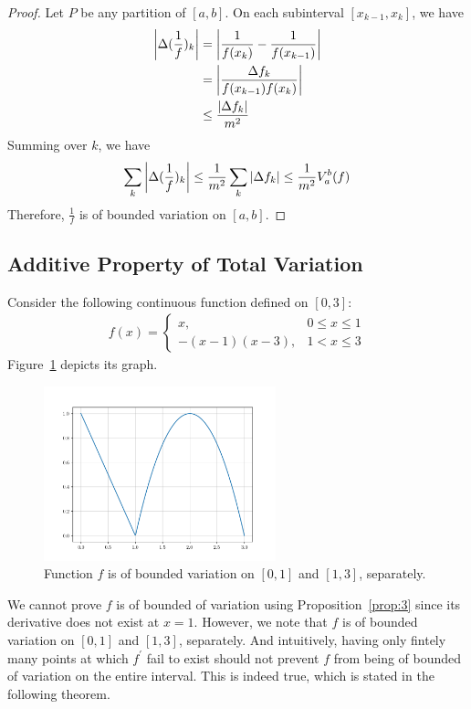 \documentclass[thmcnt=section, color=blue, 12pt]{my-elegantbook}
\begin{document}
\begin{proof}
	Let $P$ be any partition of $[a, b]$.
	On each subinterval $[x_{k-1}, x_k]$, we have
	\begin{align*}
		\left\lvert \Delta (\frac{1}{f})_k \right\rvert
		 & = \left\lvert \frac{1}{f(x_k)} - \frac{1}{f(x_{k-1})} \right\rvert \\
		 & = \left\lvert \frac{\Delta f_k}{f(x_{k-1}) f(x_k)} \right\rvert    \\
		 & \leq \frac{\left\lvert  \Delta f_k  \right\rvert}{m^2}
	\end{align*}
	Summing over $k$, we have
	\begin{align*}
		\sum_k \left\lvert \Delta (\frac{1}{f})_k \right\rvert
		\leq \frac{1}{m^2} \sum_k \left\lvert \Delta f_k \right\rvert
		\leq \frac{1}{m^2} V_a^b (f)
	\end{align*}
	Therefore, $\frac{1}{f}$ is of bounded variation on $[a, b]$.
\end{proof}

\subsection{Additive Property of Total Variation}

Consider the following continuous function defined on $[0, 3]$:
\begin{align*}
	f(x) = \begin{cases}
		       x,           & 0 \leq x \leq 1 \\
		       -(x-1)(x-3), & 1 < x \leq 3
	       \end{cases}
\end{align*}
Figure~\ref{fig:4} depicts its graph.
\begin{figure}[H]
	\centering
	\includegraphics[width=0.6\textwidth]{figures/additive-property-of-total-variation-example-1.png}
	\caption{Function $f$ is of bounded variation on $[0, 1]$ and $[1, 3]$, separately.}
	\label{fig:4}
\end{figure}
We cannot prove $f$ is of bounded of variation using
Proposition~\ref{prop:3} since its derivative does not exist at $x=1$.
However, we note that $f$ is of bounded variation
on $[0, 1]$ and $[1, 3]$, separately.
And intuitively, having only
fintely many points at which $f^\prime$ fail to exist
should not
prevent $f$ from being of bounded of variation on the entire interval.
This is indeed true, which is stated in the following theorem.
\end{document}
